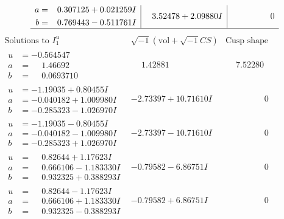 \documentclass[1p]{elsarticle_modified}
\theoremstyle{definition}
\newcommand{\I}{\sqrt{-1}}
\begin{document}
$$\begin{array}{c|c|c}
\begin{aligned}
a &= \phantom{-}0.307125 + 0.021259 I \\
b &= \phantom{-}0.769443 - 0.511761 I\end{aligned}
 & \phantom{-}3.52478 + 2.09880 I & \phantom{-0.000000 } 0\\
 \hline 
 \end{array}$$\newpage$$\begin{array}{c|c|c}  
\text{Solutions to }I^u_{1}& \I (\text{vol} + \sqrt{-1}CS) & \text{Cusp shape}\\
 \hline 
\begin{aligned}
u &= -0.564547\phantom{ +0.000000I} \\
a &= \phantom{-}1.46692\phantom{ +0.000000I} \\
b &= \phantom{-}0.0693710\phantom{ +0.000000I}\end{aligned}
 & \phantom{-}1.42881\phantom{ +0.000000I} & \phantom{-}7.52280\phantom{ +0.000000I} \\ \hline\begin{aligned}
u &= -1.19035 + 0.80455 I \\
a &= -0.040182 + 1.009980 I \\
b &= -0.285323 - 1.026970 I\end{aligned}
 & -2.73397 + 10.71610 I & \phantom{-0.000000 } 0 \\ \hline\begin{aligned}
u &= -1.19035 - 0.80455 I \\
a &= -0.040182 - 1.009980 I \\
b &= -0.285323 + 1.026970 I\end{aligned}
 & -2.73397 - 10.71610 I & \phantom{-0.000000 } 0 \\ \hline\begin{aligned}
u &= \phantom{-}0.82644 + 1.17623 I \\
a &= \phantom{-}0.666106 - 1.183330 I \\
b &= \phantom{-}0.932325 + 0.388293 I\end{aligned}
 & -0.79582 - 6.86751 I & \phantom{-0.000000 } 0 \\ \hline\begin{aligned}
u &= \phantom{-}0.82644 - 1.17623 I \\
a &= \phantom{-}0.666106 + 1.183330 I \\
b &= \phantom{-}0.932325 - 0.388293 I\end{aligned}
 & -0.79582 + 6.86751 I & \phantom{-0.000000 } 0 \\ \hline\begin{aligned}

\end{aligned}
\end{array}$$
\end{document}
